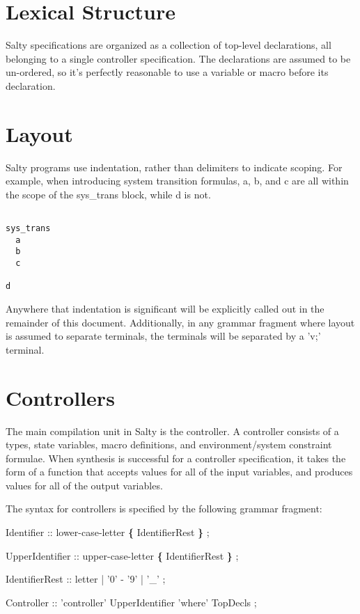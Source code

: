 
\section{Lexical Structure}

Salty specifications are organized as a collection of top-level declarations, all belonging to a single controller specification. The declarations are assumed to be un-ordered, so it's perfectly reasonable to use a variable or macro before its declaration.


\section{Layout}

Salty programs use indentation, rather than delimiters to indicate scoping. For example, when introducing system transition formulas, a, b, and c are all within the scope of the sys\_trans block, while d is not.

\begin{lstlisting}

sys_trans
  a
  b
  c

d

\end{lstlisting}

Anywhere that indentation is significant will be explicitly called out in the remainder of this document. Additionally, in any grammar fragment where layout is assumed to separate terminals, the terminals will be separated by a 'v;' terminal.

\section{Controllers}

The main compilation unit in Salty is the controller. A controller consists of a types, state variables, macro definitions, and environment/system constraint formulae. When synthesis is successful for a controller specification, it takes the form of a function that accepts values for all of the input variables, and produces values for all of the output variables.

\noindent The syntax for controllers is specified by the following grammar fragment:

\begin{Grammar}
  Identifier      :: lower-case-letter \textbf{\{} IdentifierRest \textbf{\}} ;

  UpperIdentifier :: upper-case-letter \textbf{\{} IdentifierRest \textbf{\}} ;

  IdentifierRest  :: letter | '0' - '9' | '_' ;

  Controller      :: 'controller' UpperIdentifier 'where' TopDecls ;
\end{Grammar}

